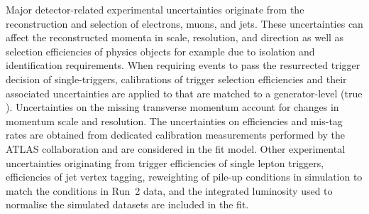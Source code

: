 Major detector-related experimental uncertainties originate from the
reconstruction and selection of electrons, muons, \tauhadvis and jets.
These uncertainties can affect the reconstructed momenta in scale,
resolution, and direction as well as selection efficiencies of physics
objects for example due to isolation and identification
requirements. When requiring events to pass the resurrected trigger
decision of single-\tauhadvis triggers, calibrations of trigger
selection efficiencies and their associated uncertainties are applied
to \tauhadvis that are matched to a generator-level \tauhad (true
\tauhadvis). Uncertainties on the missing transverse momentum account
for changes in momentum scale and resolution. The uncertainties on
\btag efficiencies and mis-tag rates are obtained from dedicated
calibration measurements performed by the ATLAS collaboration and are
considered in the fit model. Other experimental uncertainties
originating from trigger efficiencies of single lepton triggers,
efficiencies of jet vertex tagging, reweighting of pile-up conditions
in simulation to match the conditions in Run~2 data, and the
integrated luminosity used to normalise the simulated datasets are
included in the fit.

